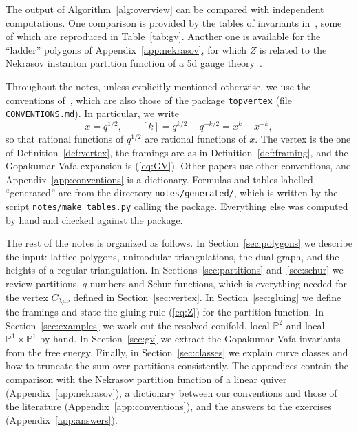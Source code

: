 \documentclass[11pt]{article}
\theoremstyle{plain}
\theoremstyle{definition}
\theoremstyle{remark}
\newcommand{\PP}{\mathbb{P}}
\newcommand{\topvertex}{\texttt{topvertex}}
\begin{document}
The output of Algorithm~\ref{alg:overview} can be compared with independent computations. One
comparison is provided by the tables of invariants in~\cite{CKYZ,KKV}, some of which are
reproduced in Table~\ref{tab:gv}. Another one is available for the ``ladder'' polygons of
Appendix~\ref{app:nekrasov}, for which $Z$ is related to the Nekrasov instanton partition
function of a 5d gauge theory~\cite{Nekrasov,IKP-SUN}.

Throughout the notes, unless explicitly mentioned otherwise, we use the conventions
of~\cite{Kon}, which are also those of the package \topvertex{} (file \texttt{CONVENTIONS.md}). In
particular, we write
\begin{equation}
x=q^{1/2},\qquad [k]=q^{k/2}-q^{-k/2}=x^k-x^{-k},
\end{equation}
so that rational functions of $q^{1/2}$ are rational functions of $x$. The vertex is the one of
Definition~\ref{def:vertex}, the framings are as in Definition~\ref{def:framing}, and the
Gopakumar-Vafa expansion is (\ref{eq:GV}). Other papers use other conventions, and
Appendix~\ref{app:conventions} is a dictionary. Formulas and tables labelled ``generated'' are
\verb|| from the directory \texttt{notes/generated/}, which is written by the script
\texttt{notes/make\_tables.py} calling the package. Everything else was computed by hand and
checked against the package.

The rest of the notes is organized as follows. In Section~\ref{sec:polygons} we describe the
input: lattice polygons, unimodular triangulations, the dual graph, and the heights of a
regular triangulation. In Sections~\ref{sec:partitions} and~\ref{sec:schur} we review
partitions, $q$-numbers and Schur functions, which is everything needed for the vertex
$C_{\lambda\mu\nu}$ defined in Section~\ref{sec:vertex}. In Section~\ref{sec:gluing} we define
the framings and state the gluing rule (\ref{eq:Z}) for the partition function. In
Section~\ref{sec:examples} we work out the resolved conifold, local $\PP^2$ and local
$\PP^1\times\PP^1$ by hand. In Section~\ref{sec:gv} we extract the Gopakumar-Vafa invariants
from the free energy. Finally, in Section~\ref{sec:classes} we explain curve classes and how to
truncate the sum over partitions consistently. The appendices contain the comparison with the
Nekrasov partition function of a linear quiver (Appendix~\ref{app:nekrasov}), a dictionary
between our conventions and those of the literature (Appendix~\ref{app:conventions}), and the
answers to the exercises (Appendix~\ref{app:answers}).
\end{document}

